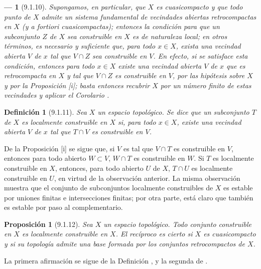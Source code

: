 \documentclass[10pt,oneside,openany]{book}
\theoremstyle{egaenv}\newtheorem*{env}{---}
\theoremstyle{egastatement}
\newtheorem*{proposition}{Proposición}
\theoremstyle{egadescription}
\newtheorem*{definition}{Definición}
\newcommand{\oldpage}[2][]{\marginnote{\normalfont\scriptsize\textbf{#1}\,|\,#2}\ignorespaces}
\begin{document}
\begin{env}[9.1.10]
\label{0.9.1.10}
\label{0.9.1.10-fr}
Supongamos, en particular, que $X$ es cuasicompacto y que todo punto
\oldpage[0\textsubscript{III}]{14}
de $X$ admite un sistema fundamental de vecindades abiertas retrocompactas en $X$ (y \emph{a fortiori} cuasicompactas); entonces la condición para que un subconjunto $Z$ de $X$ sea construible en $X$ es de naturaleza \emph{local}; en otros términos, es necesario y suficiente que, para todo $x\in X$, exista una vecindad abierta $V$ de $x$ tal que $V\cap Z$ sea construible en $V$.
En efecto, si se satisface esta condición, entonces para todo $x\in X$ existe una vecindad abierta $V$ de $x$ que es \emph{retrocompacta en $X$} y tal que $V\cap Z$ es construible en $V$, por las hipótesis sobre $X$ y por la Proposición [i]; basta entonces recubrir $X$ por un número finito de estas vecindades y aplicar el Corolario .
\end{env}

\begin{definition}[9.1.11]
\label{0.9.1.11}
\label{0.9.1.11-fr}
Sea $X$ un espacio topológico.
Se dice que un subconjunto $T$ de $X$ es localmente construible en $X$ si, para todo $x\in X$, existe una vecindad abierta $V$ de $x$ tal que $T\cap V$ es construible en $V$.
\end{definition}

De la Proposición [i] se sigue que, si $V$ es tal que $V\cap T$ es construible en $V$, entonces para todo abierto $W\subset V$, $W\cap T$ es construible en $W$.
Si $T$ es localmente construible en $X$, entonces, para todo abierto $U$ de $X$, $T\cap U$ es localmente construible en $U$, en virtud de la observación anterior.
La misma observación muestra que el conjunto de subconjuntos localmente construibles de $X$ es estable por uniones finitas e intersecciones finitas; por otra parte, está claro que también es estable por paso al complementario.

\begin{proposition}[9.1.12]
\label{0.9.1.12}
\label{0.9.1.12-fr}
Sea $X$ un espacio topológico.
Todo conjunto construible en $X$ es localmente construible en $X$.
El recíproco es cierto si $X$ es cuasicompacto y si su topología admite una base formada por los conjuntos retrocompactos de $X$.
\end{proposition}


La primera afirmación se sigue de la Definición , y la segunda de .
\end{document}
